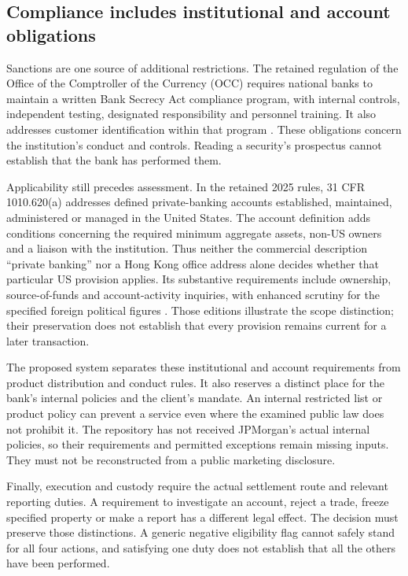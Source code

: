 \documentclass[12pt,a4paper,oneside,openany]{book}
\begin{document}
\subsection{Compliance includes institutional and account obligations}

Sanctions are one source of additional restrictions. The retained regulation of
the Office of the Comptroller of the Currency (OCC) requires national banks to maintain a written Bank Secrecy Act
compliance program, with internal controls, independent testing, designated
responsibility and personnel training. It also addresses customer identification
within that program \citep[12 CFR 21.21(c)--(d), 2025 edition]{occbsa2025}.
These obligations concern the institution's conduct and controls. Reading a
security's prospectus cannot establish that the bank has performed them.

Applicability still precedes assessment. In the retained 2025 rules,
31 CFR 1010.620(a) addresses defined private-banking accounts established,
maintained, administered or managed in the United States. The account definition
adds conditions concerning the required minimum aggregate assets, non-US owners
and a liaison with the institution. Thus neither the commercial description
``private banking'' nor a Hong Kong office address alone decides whether that
particular US provision applies. Its substantive requirements include ownership,
source-of-funds and account-activity inquiries, with enhanced scrutiny for the
specified foreign political figures
\citep[31 CFR 1010.605(m), 2025 edition]{fincenprivatebankdef2025}
\citep[31 CFR 1010.620(a)--(d), 2025 edition]{fincenprivatebankdd2025}.
Those editions illustrate the scope distinction; their preservation does not
establish that every provision remains current for a later transaction.

The proposed system separates these institutional and account requirements from
product distribution and conduct rules. It also reserves a distinct place for
the bank's internal policies and the client's mandate. An internal restricted
list or product policy can prevent a service even where the examined public law
does not prohibit it. The repository has not received JPMorgan's actual internal
policies, so their requirements and permitted exceptions remain missing inputs.
They must not be reconstructed from a public marketing disclosure.

Finally, execution and custody require the actual settlement route and relevant
reporting duties. A requirement to investigate an account, reject a trade,
freeze specified property or make a report has a different legal effect. The
decision must preserve those distinctions. A generic negative eligibility flag
cannot safely stand for all four actions, and satisfying one duty does not
establish that all the others have been performed.
\end{document}
